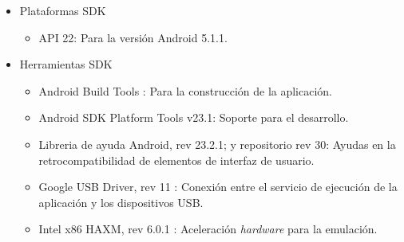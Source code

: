 \documentclass[../PFC.tex]{subfiles}
\begin{document}
\begin{itemize}
\item{Plataformas SDK}
	\begin{itemize}
	\item{API 22: Para la versión Android 5.1.1.}
	\end{itemize}
\item{Herramientas SDK}
	\begin{itemize}
	\item{Android Build Tools : Para la construcción de la aplicación.}
	\item{Android SDK Platform Tools v23.1: Soporte para el desarrollo.}
	\item{Libreria de ayuda Android, rev 23.2.1; y repositorio rev 30: Ayudas en la retrocompatibilidad 	de elementos de interfaz de usuario.}
	\item{Google USB Driver, rev 11 : Conexión entre el servicio de ejecución de la aplicación y los dispositivos USB.}
	\item{Intel x86 HAXM, rev 6.0.1 : Aceleración \textit{hardware} para la emulación.}
	\end{itemize}
\end{itemize}
\end{document}
